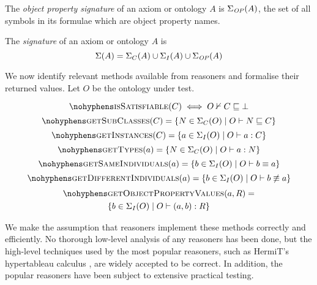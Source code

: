\documentclass[paper.tex]{subfiles}
\begin{document}
\begin{definition}
  The \emph{object property signature} of an axiom or ontology $A$ is $\Sigma_\mathit{OP}(A)$, the set of all symbols in its formulae which are object property names.
\end{definition}

\begin{definition}
  The \emph{signature} of an axiom or ontology $A$ is
  \[ \Sigma(A) = \Sigma_C(A) \cup \Sigma_I(A) \cup \Sigma_\mathit{OP}(A) \]
\end{definition}

We now identify relevant methods available from reasoners and formalise their returned values.  Let $O$ be the ontology under test.

\[ \textproc{isSatisfiable}(C) \iff O \nsementails C \sqsubseteq \bot \]
\[ \textproc{getSubClasses}(C) = \{ N \in \signatureC(O) \mid O \sementails N \sqsubseteq C \} \]
\[ \textproc{getInstances}(C) = \{ a \in \signatureI(O) \mid O \sementails a : C \} \]
\[ \textproc{getTypes}(a) = \{ N \in \signatureC(O) \mid O \sementails a : N \} \]
\[ \textproc{getSameIndividuals}(a) = \{ b \in \signatureI(O) \mid O \sementails b \equiv a \} \]
\[ \textproc{getDifferentIndividuals}(a) = \{ b \in \signatureI(O) \mid O \sementails b \not\equiv a \} \]
\begin{multline*}
  \textproc{getObjectPropertyValues}(a, R) = \\
  \{ b \in \signatureI(O) \mid O \sementails (a, b) : R \}
\end{multline*}


We make the assumption that reasoners implement these methods correctly and efficiently.  No thorough low-level analysis of any reasoners has been done, but the high-level techniques used by the most popular reasoners, such as HermiT's hypertableau calculus \cite{Glimm:HermiT}, are widely accepted to be correct.  In addition, the popular reasoners have been subject to extensive practical testing.
\end{document}
